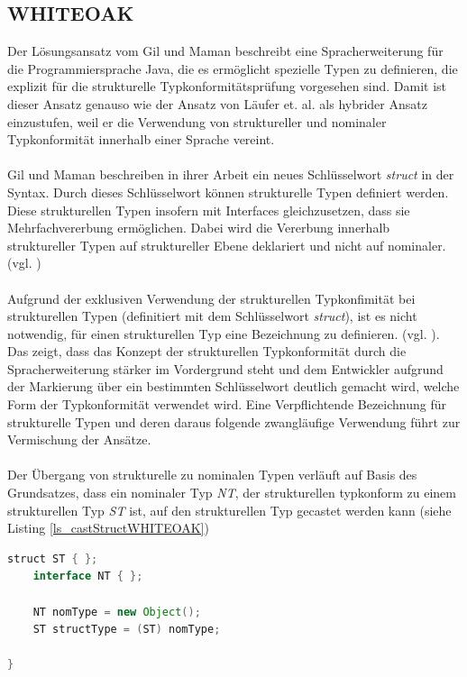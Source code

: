 \documentclass[11pt, 
ngerman,
doublespacing,
chapterinoneline, %
consistentlayout, %
]{scrartcl}
\begin{document}
\subsection{WHITEOAK}
Der Lösungsansatz vom Gil und Maman \cite{whiteoak} beschreibt eine Spracherweiterung für die Programmiersprache Java, die es ermöglicht spezielle Typen zu definieren, die explizit für die strukturelle Typkonformitätsprüfung vorgesehen sind. Damit ist dieser Ansatz genauso wie der Ansatz von Läufer et. al. \cite{structconfjava} als hybrider Ansatz einzustufen, weil er die Verwendung von struktureller und nominaler Typkonformität innerhalb einer Sprache vereint.\\\\
Gil und Maman beschreiben in ihrer Arbeit ein neues Schlüsselwort \emph{struct} in der Syntax. Durch dieses Schlüsselwort können strukturelle Typen definiert werden. Diese strukturellen Typen insofern mit Interfaces gleichzusetzen, dass sie Mehrfachvererbung ermöglichen. Dabei wird die Vererbung innerhalb struktureller Typen auf struktureller Ebene deklariert und nicht auf nominaler.  (vgl. \cite{whiteoak})\\\\
Aufgrund der exklusiven Verwendung der strukturellen Typkonfimität bei strukturellen Typen (definitiert mit dem Schlüsselwort \emph{struct}), ist es nicht notwendig, für einen strukturellen Typ eine Bezeichnung zu definieren. (vgl. \cite{whiteoak}). Das zeigt, dass das Konzept der strukturellen Typkonformität durch die Spracherweiterung stärker im Vordergrund steht und dem Entwickler aufgrund der Markierung über ein bestimmten Schlüsselwort deutlich gemacht wird, welche Form der Typkonformität verwendet wird. Eine Verpflichtende Bezeichnung für strukturelle Typen und deren daraus folgende zwangläufige Verwendung führt zur Vermischung der Ansätze.\\\\
Der Übergang von strukturelle zu nominalen Typen verläuft auf Basis des Grundsatzes, dass ein nominaler Typ \emph{NT}, der strukturellen typkonform zu einem strukturellen Typ \emph{ST} ist, auf den strukturellen Typ gecastet werden kann (siehe Listing \ref{ls_castStructWHITEOAK})\\
\begin{lstlisting}[language=Java, label=ls_castStructWHITEOAK, caption=Strukturelle Typen auf nominale Typen casten]
	struct ST { };
	interface NT { };
	
	NT nomType = new Object(); 
	ST structType = (ST) nomType;
		
}
\end{lstlisting}
\end{document}
